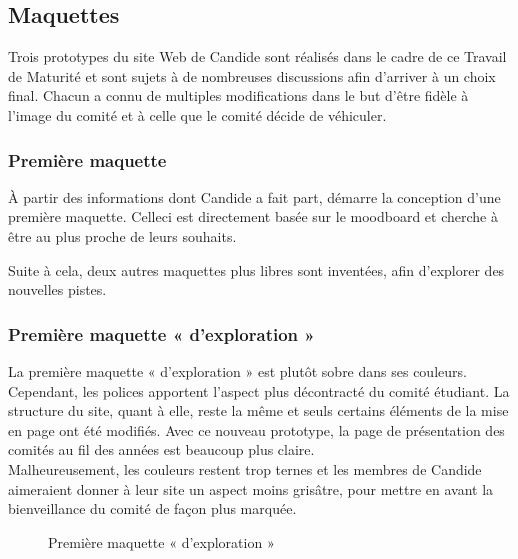 \documentclass[a4,10pt,french]{sphinxmanual}
\begin{document}
\subsection{Maquettes}
\label{\detokenize{chapitre-06:maquettes}}
\sphinxAtStartPar
Trois prototypes du site Web de Candide sont réalisés dans le cadre de ce Travail de Maturité et sont sujets à de nombreuses discussions afin d’arriver à un choix final. Chacun a connu de multiples modifications dans le but d’être fidèle à l’image du comité et à celle que le comité décide de véhiculer.


\subsubsection{Première maquette}
\label{\detokenize{chapitre-06:premiere-maquette}}
\sphinxAtStartPar
À partir des informations dont Candide a fait part, démarre la conception d’une première maquette. Celle\sphinxhyphen{}ci est directement basée sur le moodboard et cherche à être au plus proche de leurs souhaits.

\sphinxAtStartPar
Suite à cela, deux autres maquettes plus libres sont inventées, afin d’explorer des nouvelles pistes.


\subsubsection{Première maquette « d’exploration »}
\label{\detokenize{chapitre-06:premiere-maquette-dexploration}}
\sphinxAtStartPar
La première maquette « d’exploration » est plutôt sobre dans ses couleurs. Cependant, les polices apportent l’aspect plus décontracté du comité étudiant. La structure du site, quant à elle, reste la même et seuls certains éléments de la mise en page ont été modifiés. Avec ce nouveau prototype, la page de présentation des comités au fil des années est beaucoup plus claire.\\
Malheureusement, les couleurs restent trop ternes et les membres de Candide aimeraient donner à leur site un aspect moins grisâtre, pour mettre en avant la bienveillance du comité de façon plus marquée.

\begin{figure}[htbp]
\centering
\capstart

\noindent{}
\caption{Première maquette « d’exploration »}\label{\detokenize{chapitre-06:id2}}\end{figure}
\end{document}
